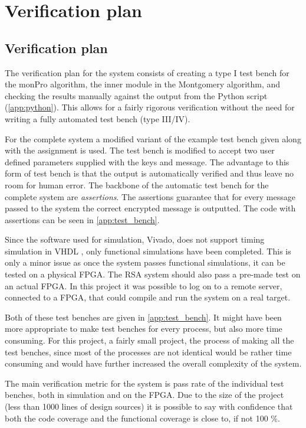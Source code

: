 \section{Verification plan}
%
\subsection{Verification plan}
The verification plan for the system consists of creating a type I test bench
\cite[p.244]{pedroni} for the monPro algorithm, the inner module in the Montgomery algorithm,
and checking the results manually against the output from the Python script (\cref{app:python}).
This allows for a fairly rigorous verification without the need for writing a fully
automated test bench (type III/IV). 

For the complete system a modified variant of the example test bench given along with the 
assignment is used. The test bench is modified to accept two user defined parameters 
supplied with the keys and message. The advantage to this form of test bench is that
the output is automatically verified and thus leave no room for human error. The backbone
of the automatic test bench for the complete system are \emph{assertions}. The assertions
guarantee that for every message passed to the system the correct encrypted message is outputted.
The code with assertions can be seen in \cref{app:test_bench}.

Since the software used for simulation, Vivado, does not support timing simulation in VHDL
\cite{vivado_timing_sim}, only functional simulations have been completed. 
This is only a minor issue as once the system passes functional simulations, 
it can be tested on a physical FPGA. The RSA system should also pass a pre-made test on an actual
FPGA. In this project it was possible to log on to a remote server, connected to a FPGA, that could
compile and run the system on a real target. 

Both of these test benches are given in \cref{app:test_bench}. It might have been more
appropriate to make test benches for every process, but also more time consuming. For this
project, a fairly small project, the process of making all the test benches, since most of
the processes are not identical would be rather time consuming and would have further 
increased the overall complexity of the system. 

The main verification metric for the system is pass rate of the individual test benches, 
both in simulation and on the FPGA. Due to the size of the project (less than 1000 lines of 
design sources) it is possible to say with confidence that both the code coverage and the 
functional coverage is close to, if not 100 \%. 
%
